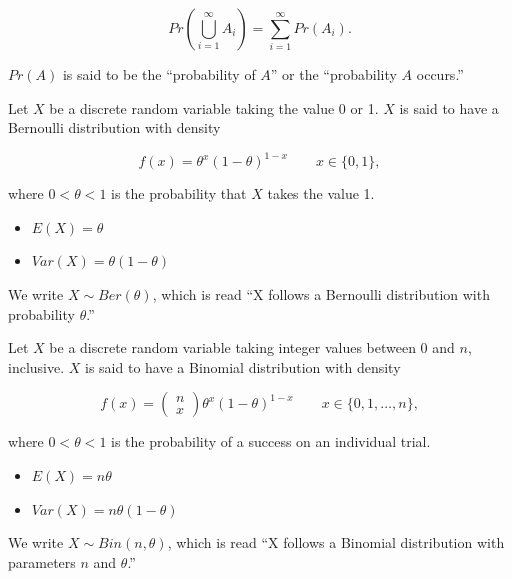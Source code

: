 \documentclass[
  letterpaper,
  DIV=11,
  numbers=noendperiod]{scrreprt}
\providecommand{\tightlist}{%
  \setlength{\itemsep}{0pt}\setlength{\parskip}{0pt}}\usepackage{longtable,booktabs,array}
\theoremstyle{definition}
\theoremstyle{definition}
\theoremstyle{plain}
\theoremstyle{remark}
\begin{document}
\[Pr\left(\bigcup_{i = 1}^{\infty} A_i\right) = \sum_{i = 1}^{\infty} Pr\left(A_i\right).\]

\(Pr(A)\) is said to be the ``probability of \(A\)'' or the
``probability \(A\) occurs.''

\begin{description}
\tightlist
\item[Bernoulli Distribution
(Definition~\ref{def-bernoulli-distribution})]
Let \(X\) be a discrete random variable taking the value 0 or 1. \(X\)
is said to have a Bernoulli distribution with density
\end{description}

\[f(x) = \theta^x (1 - \theta)^{1 - x} \qquad x \in \{0, 1\},\]

where \(0 < \theta < 1\) is the probability that \(X\) takes the value
1.

\begin{itemize}
\tightlist
\item
  \(E(X) = \theta\)
\item
  \(Var(X) = \theta(1 - \theta)\)
\end{itemize}

We write \(X \sim Ber(\theta)\), which is read ``X follows a Bernoulli
distribution with probability \(\theta\).''

\begin{description}
\tightlist
\item[Binomial Distribution
(Definition~\ref{def-binomial-distribution})]
Let \(X\) be a discrete random variable taking integer values between 0
and \(n\), inclusive. \(X\) is said to have a Binomial distribution with
density
\end{description}

\[f(x) = \begin{pmatrix}n \\ x\end{pmatrix} \theta^x (1 - \theta)^{1 - x} \qquad x \in \{0, 1, \dotsc, n\},\]

where \(0 < \theta < 1\) is the probability of a success on an
individual trial.

\begin{itemize}
\tightlist
\item
  \(E(X) = n\theta\)
\item
  \(Var(X) = n\theta(1 - \theta)\)
\end{itemize}

We write \(X \sim Bin(n, \theta)\), which is read ``X follows a Binomial
distribution with parameters \(n\) and \(\theta\).''
\end{document}
